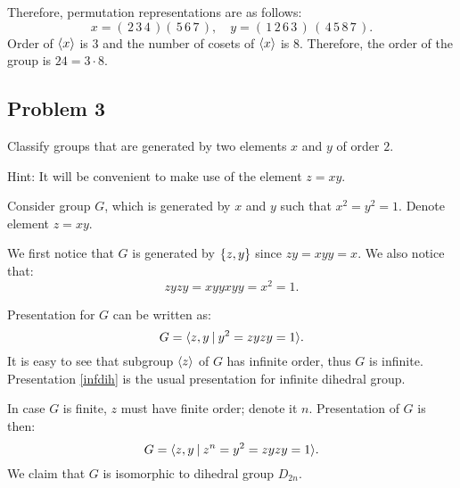 \documentclass{article}
\theoremstyle{definition}
\DeclarePairedDelimiter\set{\{}{\}}
\DeclarePairedDelimiter\genby{\langle}{\rangle}
\begin{document}
Therefore, permutation representations are as follows:
\[
    x = (\,2\,3\,4\,)(\,5\,6\,7\,), \quad
    y = (\,1\,2\,6\,3\,)\,(\,4\,5\,8\,7\,).
\]
Order of $\genby{x}$ is $3$ and the number of cosets of $\genby{x}$ is $8$.
Therefore, the order of the group is $24 = 3 \cdot 8$.

\subsection*{Problem 3}

\begin{tcolorbox}
Classify groups that are generated by two elements $x$ and $y$ of order $2$.

Hint: It will be convenient to make use of the element $z = xy$.
\end{tcolorbox}

Consider group $G$, which is generated by $x$ and $y$ such that $x^2 = y^2 = 1$.
Denote element $z = xy$.

We first notice that $G$ is generated by $\set{z,y}$ since $zy = xyy = x$.
We also notice that:
\[
    zyzy = xyyxyy = x^2 = 1.
\]

Presentation for $G$ can be written as:
\begin{equation} \label{infdih}
    G = \genby{z, y \> | \> y^2 = zyzy = 1}.
\end{equation}
It is easy to see that subgroup $\genby{z}$ of $G$ has infinite order, thus $G$ is infinite.
Presentation \ref{infdih} is the usual presentation for infinite dihedral group.

In case $G$ is finite, $z$ must have finite order; denote it $n$.
Presentation of $G$ is then:
\begin{equation} \label{dihedral}
    G = \genby{z, y \> | \> z^n = y^2 = zyzy = 1}.
\end{equation}
We claim that $G$ is isomorphic to dihedral group $D_{2n}$.
\end{document}
